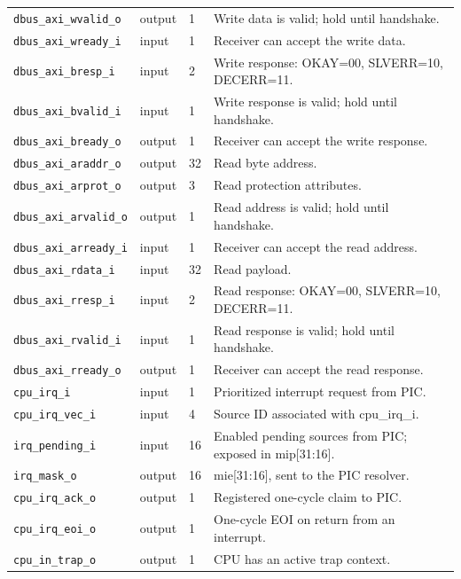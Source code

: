 \documentclass[11pt]{article}
\begin{document}
{\begin{longtable}{@{}L{0.3400\dimexpr\linewidth-36pt\relax}L{0.1000\dimexpr\linewidth-36pt\relax}L{0.1000\dimexpr\linewidth-36pt\relax}L{0.4600\dimexpr\linewidth-36pt\relax}@{}}
\texttt{dbus\_axi\_wvalid\_o} & output & 1 & Write data is valid; hold until handshake. \\ \addlinespace[3pt]
\texttt{dbus\_axi\_wready\_i} & input & 1 & Receiver can accept the write data. \\ \addlinespace[3pt]
\texttt{dbus\_axi\_bresp\_i} & input & 2 & Write response: OKAY=00, SLVERR=10, DECERR=11. \\ \addlinespace[3pt]
\texttt{dbus\_axi\_bvalid\_i} & input & 1 & Write response is valid; hold until handshake. \\ \addlinespace[3pt]
\texttt{dbus\_axi\_bready\_o} & output & 1 & Receiver can accept the write response. \\ \addlinespace[3pt]
\texttt{dbus\_axi\_araddr\_o} & output & 32 & Read byte address. \\ \addlinespace[3pt]
\texttt{dbus\_axi\_arprot\_o} & output & 3 & Read protection attributes. \\ \addlinespace[3pt]
\texttt{dbus\_axi\_arvalid\_o} & output & 1 & Read address is valid; hold until handshake. \\ \addlinespace[3pt]
\texttt{dbus\_axi\_arready\_i} & input & 1 & Receiver can accept the read address. \\ \addlinespace[3pt]
\texttt{dbus\_axi\_rdata\_i} & input & 32 & Read payload. \\ \addlinespace[3pt]
\texttt{dbus\_axi\_rresp\_i} & input & 2 & Read response: OKAY=00, SLVERR=10, DECERR=11. \\ \addlinespace[3pt]
\texttt{dbus\_axi\_rvalid\_i} & input & 1 & Read response is valid; hold until handshake. \\ \addlinespace[3pt]
\texttt{dbus\_axi\_rready\_o} & output & 1 & Receiver can accept the read response. \\ \addlinespace[3pt]
\texttt{cpu\_irq\_i} & input & 1 & Prioritized interrupt request from PIC. \\ \addlinespace[3pt]
\texttt{cpu\_irq\_vec\_i} & input & 4 & Source ID associated with cpu\_irq\_i. \\ \addlinespace[3pt]
\texttt{irq\_pending\_i} & input & 16 & Enabled pending sources from PIC; exposed in mip[31:16]. \\ \addlinespace[3pt]
\texttt{irq\_mask\_o} & output & 16 & mie[31:16], sent to the PIC resolver. \\ \addlinespace[3pt]
\texttt{cpu\_irq\_ack\_o} & output & 1 & Registered one-cycle claim to PIC. \\ \addlinespace[3pt]
\texttt{cpu\_irq\_eoi\_o} & output & 1 & One-cycle EOI on return from an interrupt. \\ \addlinespace[3pt]
\texttt{cpu\_in\_trap\_o} & output & 1 & CPU has an active trap context. \\*
\bottomrule\end{longtable}}
\end{document}
